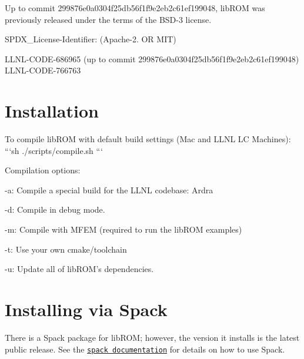 Up to commit 299876e0a0304f25db56f1f9e2eb2c61ef199048, lib\-R\-O\-M was previously released under the terms of the B\-S\-D-\/3 license.

S\-P\-D\-X\-\_\-\-License-\/\-Identifier\-: (Apache-\/2. O\-R M\-I\-T)

L\-L\-N\-L-\/\-C\-O\-D\-E-\/686965 (up to commit 299876e0a0304f25db56f1f9e2eb2c61ef199048) L\-L\-N\-L-\/\-C\-O\-D\-E-\/766763

\section*{Installation}

To compile lib\-R\-O\-M with default build settings (Mac and L\-L\-N\-L L\-C Machines)\-: ```sh ./scripts/compile.sh ```

Compilation options\-:


\begin{DoxyItemize}
\item -\/a\-: Compile a special build for the L\-L\-N\-L codebase\-: Ardra
\item -\/d\-: Compile in debug mode.
\item -\/m\-: Compile with M\-F\-E\-M (required to run the lib\-R\-O\-M examples)
\item -\/t\-: Use your own cmake/toolchain
\item -\/u\-: Update all of lib\-R\-O\-M's dependencies.
\end{DoxyItemize}

\section*{Installing via Spack}

There is a Spack package for lib\-R\-O\-M; however, the version it installs is the latest public release. See the \href{http://spack.readthedocs.io/en/latest/index.html}{\tt spack documentation} for details on how to use Spack. 